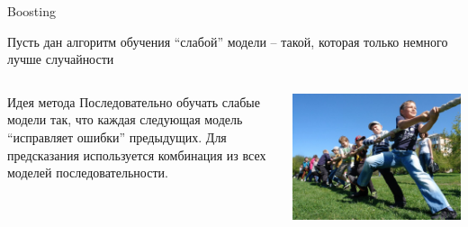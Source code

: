 \documentclass[10pt,a4paper]{beamer}
\begin{document}
\begin{frame}{Boosting}

Пусть дан алгоритм обучения ``слабой'' модели -- такой, которая только немного 				лучше случайности
\vspace{1em}

\begin{columns}[C]
    \begin{column}{.5\textwidth} 
	\begin{block}{Идея метода}	
		Последовательно обучать слабые модели так, что каждая следующая модель 						``исправляет ошибки'' предыдущих. Для предсказания используется комбинация из 			всех моделей последовательности.
	\end{block}		    
    \end{column}
    \begin{column}{.5\textwidth} 
    \vspace{-1em}
    \includegraphics[scale=0.18]{images/children.jpg}    
    \end{column}
\end{columns}

\end{frame}

\end{document}
